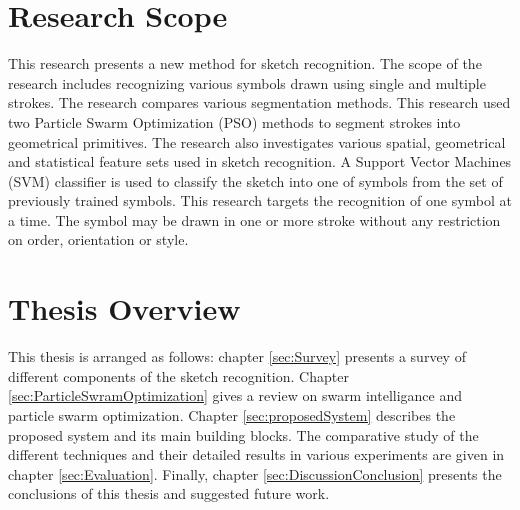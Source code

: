 \section{Research Scope}
This research  presents a new method for sketch recognition. The scope of the research includes recognizing various symbols drawn using single and multiple strokes. The research compares various segmentation methods. This research used two Particle Swarm Optimization (PSO) \cite{PSOFirst} methods to segment strokes into geometrical primitives. The research also investigates various spatial, geometrical and statistical feature sets used in sketch recognition. A Support Vector Machines (SVM) classifier \cite{svmintroduce} is used to classify the sketch into one of symbols from the set of previously trained symbols. This research targets the recognition of one symbol at a time. The symbol may be drawn in one or more stroke without any restriction on order, orientation or style.

 
\section{Thesis Overview}
This thesis is arranged as follows: chapter \ref{sec:Survey} presents a survey of different components of the sketch recognition. Chapter \ref{sec:ParticleSwramOptimization} gives a review on swarm intelligance and particle swarm optimization.  Chapter \ref{sec:proposedSystem} describes the proposed system and its main building blocks. The comparative study of the different techniques and their detailed results in various experiments are given in chapter \ref{sec:Evaluation}. Finally, chapter \ref{sec:DiscussionConclusion} presents the conclusions of this thesis and suggested future work.
